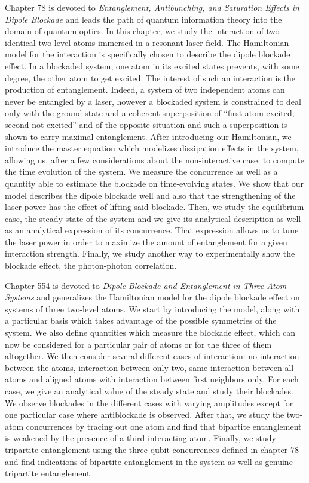 Chapter 78 is devoted to \textit{Entanglement, Antibunching, and Saturation Effects in Dipole Blockade} and leads the path of quantum information theory into the domain of quantum optics. In this chapter, we study the interaction of two identical two-level atoms immersed in a resonant laser field. The Hamiltonian model for the interaction is specifically chosen to describe the dipole blockade effect. In a blockaded system, one atom in its excited states prevents, with some degree, the other atom to get excited. The interest of such an interaction is the production of entanglement. Indeed, a system of two independent atoms can never be entangled by a laser, however a blockaded system is constrained to deal only with the ground state and a coherent superposition of ``first atom excited, second not excited'' and of the opposite situation and such a superposition is shown to carry maximal entanglement. After introducing our Hamiltonian, we introduce the master equation which modelizes dissipation effects in the system, allowing us, after a few considerations about the non-interactive case, to compute the time evolution of the system. We measure the concurrence as well as a quantity able to estimate the blockade on time-evolving states. We show that our model describes the dipole blockade well and also that the strengthening of the laser power has the effect of lifting said blockade. Then, we study the equilibrium case, the steady state of the system and we give its analytical description as well as an analytical expression of its concurrence. That expression allows us to tune the laser power in order to maximize the amount of entanglement for a given interaction strength. Finally, we study another way to experimentally show the blockade effect, the photon-photon correlation.

Chapter 554 is devoted to \textit{Dipole Blockade and Entanglement in Three-Atom Systems} and generalizes the Hamiltonian model for the dipole blockade effect on systems of three two-level atoms. We start by introducing the model, along with a particular basis which takes advantage of the possible symmetries of the system. We also define quantities which measure the blockade effect, which can now be considered for a particular pair of atoms or for the three of them altogether. We then consider several different cases of interaction:  no interaction between the atoms, interaction between only two, same interaction between all atoms and aligned atoms with interaction between first neighbors only. For each case, we give an analytical value of the steady state and study their blockades. We observe blockades in the different cases with varying amplitudes except for one particular case where antiblockade is observed. After that, we study the two-atom concurrences by tracing out one atom and find that bipartite entanglement is weakened by the presence of a third interacting atom. Finally, we study tripartite entanglement using the three-qubit concurrences defined in chapter 78 and find indications of bipartite entanglement in the system as well as genuine tripartite entanglement.

